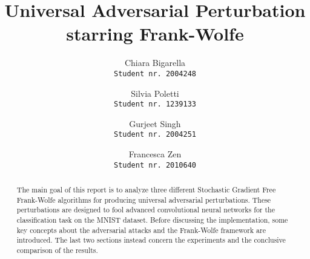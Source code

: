 \documentclass[10pt,twocolumn,letterpaper]{article}
\begin{document}
\title{Universal Adversarial Perturbation \\ starring Frank-Wolfe}
\author{Chiara Bigarella\\{\tt\footnotesize Student nr. 2004248}\and Silvia Poletti\\{\tt\footnotesize Student nr. 1239133}\and Gurjeet Singh\\{\tt\footnotesize Student nr. 2004251}\and Francesca Zen\\{\tt\footnotesize Student nr. 2010640}}
\maketitle

\begin{abstract}
	The main goal of this report is to analyze three different Stochastic Gradient Free Frank-Wolfe algorithms for producing
	universal adversarial perturbations. These perturbations are designed to fool advanced convolutional neural networks for
	the classification task on the MNIST dataset. Before discussing the implementation, some key concepts about the adversarial
	attacks and the Frank-Wolfe framework are introduced. The last two sections instead concern the experiments and the conclusive comparison of the results.
\end{abstract}













{\small
	
	
}
\end{document}
